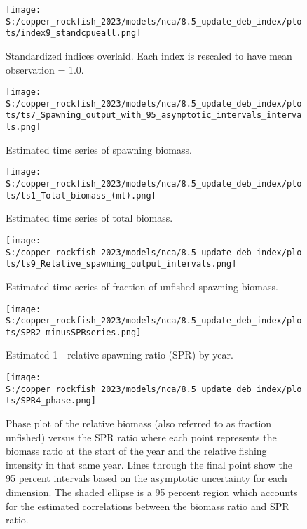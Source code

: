 \documentclass[11pt,
  english,
  letterpaper,
]{article}
\begin{document}
\begin{figure}
\centering
\texttt{[image: S:/copper\_rockfish\_2023/models/nca/8.5\_update\_deb\_index/plots/index9\_standcpueall.png]}
\caption{Standardized indices overlaid. Each index is rescaled to have mean observation = 1.0.\label{fig:standardized-indices}}
\end{figure}

\begin{figure}
\centering
\texttt{[image: S:/copper\_rockfish\_2023/models/nca/8.5\_update\_deb\_index/plots/ts7\_Spawning\_output\_with\_95\_asymptotic\_intervals\_intervals.png]}
\caption{Estimated time series of spawning biomass.\label{fig:ssb}}
\end{figure}

\begin{figure}
\centering
\texttt{[image: S:/copper\_rockfish\_2023/models/nca/8.5\_update\_deb\_index/plots/ts1\_Total\_biomass\_(mt).png]}
\caption{Estimated time series of total biomass.\label{fig:tot-bio}}
\end{figure}

\begin{figure}
\centering
\texttt{[image: S:/copper\_rockfish\_2023/models/nca/8.5\_update\_deb\_index/plots/ts9\_Relative\_spawning\_output\_intervals.png]}
\caption{Estimated time series of fraction of unfished spawning biomass.\label{fig:depl}}
\end{figure}

\begin{figure}
\centering
\texttt{[image: S:/copper\_rockfish\_2023/models/nca/8.5\_update\_deb\_index/plots/SPR2\_minusSPRseries.png]}
\caption{Estimated 1 - relative spawning ratio (SPR) by year.\label{fig:1-spr}}
\end{figure}

\clearpage

\begin{figure}
\centering
\texttt{[image: S:/copper\_rockfish\_2023/models/nca/8.5\_update\_deb\_index/plots/SPR4\_phase.png]}
\caption{Phase plot of the relative biomass (also referred to as fraction unfished) versus the SPR ratio where each point represents the biomass ratio at the start of the year and the relative fishing intensity in that same year. Lines through the final point show the 95 percent intervals based on the asymptotic uncertainty for each dimension. The shaded ellipse is a 95 percent region which accounts for the estimated correlations between the biomass ratio and SPR ratio.\label{fig:phase}}
\end{figure}
\end{document}
